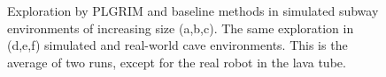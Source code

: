 \documentclass[letterpaper]{article} %
\begin{document}
\begin{figure}[t!]
    \caption{Exploration by PLGRIM and baseline methods in simulated subway environments of increasing size (a,b,c). The  same exploration in (d,e,f) simulated and real-world cave environments. This is the average of two runs, except for the real robot in the lava tube.}
    \label{fig:all_together_plot}
\end{figure}
\end{document}
